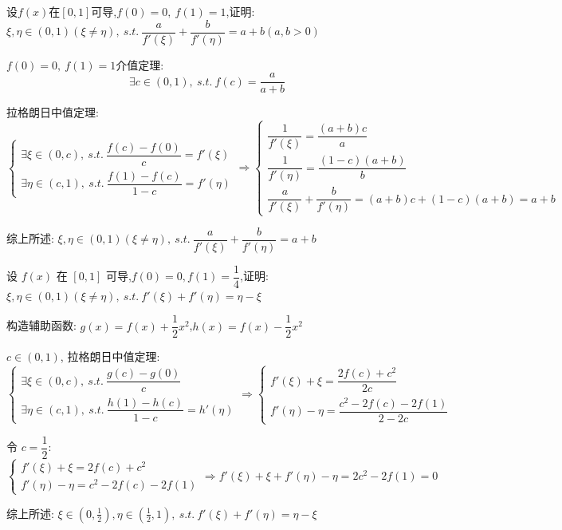 \begin{proposition}
	设$f(x)$在$[0,1]$可导,$f(0)=0,\ f(1)=1$,证明: $\xi,\eta\in(0,1)(\xi\neq \eta),\ s.t.\ \dfrac{a}{f'(\xi)}+\dfrac{b}{f'(\eta)}=a+b(a,b > 0)$
\end{proposition}
\begin{solution}

	$f(0)=0,\ f(1)=1$介值定理:
	$$\exists c\in(0,1),\ s.t.\ f(c)=\dfrac{a}{a+b}$$

	拉格朗日中值定理:
	$$\begin{cases}
		\exists\xi\in(0,c),\ s.t.\ \dfrac{f(c)-f(0)}{c} = f'(\xi) \\
		\exists\eta\in(c,1),\ s.t.\ \dfrac{f(1)-f(c)}{1-c} = f'(\eta)
	\end{cases}\Rightarrow
	\begin{cases}
		\dfrac{1}{f'(\xi)} = \dfrac{(a+b)c}{a}\\
		\dfrac{1}{f'(\eta)} = \dfrac{(1-c)(a+b)}{b}\\
		\dfrac{a}{f'(\xi)}+\dfrac{b}{f'(\eta)} = (a+b)c+(1-c)(a+b) = a+b
	\end{cases}$$
	
	综上所述: $\xi,\eta\in(0,1)(\xi\neq \eta),\ s.t.\ \dfrac{a}{f'(\xi)}+\dfrac{b}{f'(\eta)}=a+b$
\end{solution}

\begin{proposition}
	设 $f(x)$ 在 $[0,1]$ 可导,$f(0)=0,f(1)=\dfrac{1}{4}$,证明: $\xi,\eta\in(0,1)(\xi\neq \eta),\ s.t.\ f'(\xi)+f'(\eta)=\eta-\xi$
\end{proposition}
\begin{solution}

	构造辅助函数: $g(x)=f(x)+\dfrac{1}{2}x^2$,$h(x)=f(x)-\dfrac{1}{2}x^2$

	$c\in(0,1)$, 拉格朗日中值定理:
	$$\begin{cases}
		\exists\xi\in(0,c),\ s.t.\ \dfrac{g(c)-g(0)}{c} \\
		\exists\eta\in(c,1),\ s.t.\ \dfrac{h(1)-h(c)}{1-c}=h'(\eta)
	\end{cases}\Rightarrow
	\begin{cases}
		f'(\xi) +\xi = \dfrac{2f(c) + c^{2}}{2c}\\
		f'(\eta) -\eta = \dfrac{c^{2}-2f(c)-2f(1)}{2-2c}
 	\end{cases}$$

	令 $c=\dfrac{1}{2}$:
	$$\begin{cases}
		f'(\xi) +\xi = 2f(c) + c^{2}\\
		f'(\eta) -\eta = c^{2}-2f(c)-2f(1)
	\end{cases}\Rightarrow
	f'(\xi)+\xi+f'(\eta)-\eta = 2c^{2} - 2f(1) = 0
	$$

	综上所述: $\xi\in(0,\frac{1}{2}),\eta\in(\frac{1}{2},1),\ s.t.\ f'(\xi)+f'(\eta)=\eta-\xi$

\end{solution}

